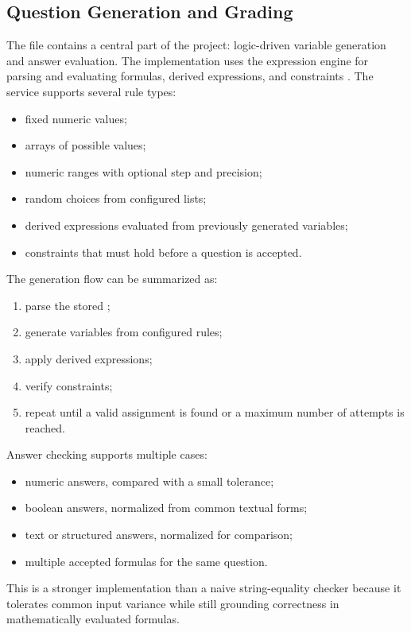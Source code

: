 \subsection{Question Generation and Grading}

The file  contains a central part of the project: logic-driven variable generation and answer evaluation. The implementation uses the  expression engine for parsing and evaluating formulas, derived expressions, and constraints \cite{mathjs-docs}. The service supports several rule types:
\begin{itemize}
  \item fixed numeric values;
  \item arrays of possible values;
  \item numeric ranges with optional step and precision;
  \item random choices from configured lists;
  \item derived expressions evaluated from previously generated variables;
  \item constraints that must hold before a question is accepted.
\end{itemize}

The generation flow can be summarized as:
\begin{enumerate}
  \item parse the stored ;
  \item generate variables from configured rules;
  \item apply derived expressions;
  \item verify constraints;
  \item repeat until a valid assignment is found or a maximum number of attempts is reached.
\end{enumerate}

Answer checking supports multiple cases:
\begin{itemize}
  \item numeric answers, compared with a small tolerance;
  \item boolean answers, normalized from common textual forms;
  \item text or structured answers, normalized for comparison;
  \item multiple accepted formulas for the same question.
\end{itemize}

This is a stronger implementation than a naive string-equality checker because it tolerates common input variance while still grounding correctness in mathematically evaluated formulas.

